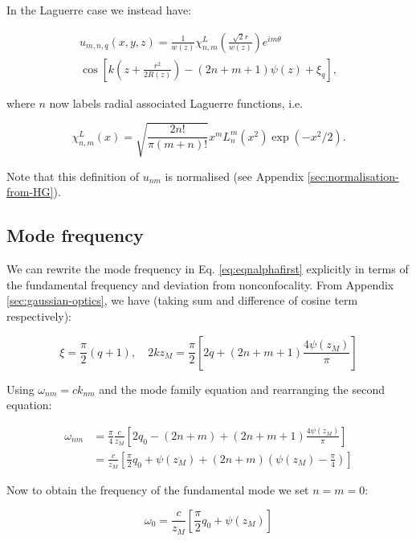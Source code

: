 \documentclass[a4paper,twocolumn,nobalancelastpage]{revtex4-1}
\begin{document}
In the Laguerre case we instead have:

\begin{multline}
  u_{m,n,q}(x,y,z) = 
  \frac{1}{w(z)}
  \chi^L_{n,m}\left( \frac{\sqrt{2}r}{w(z)} \right)
  e^{i m \theta}
  \\
  \cos \left[
    k \left( z + \frac{r^2}{2R(z)} \right) - (2n+m+1) \psi(z) + \xi_{q} \right],
\end{multline}

where $n$ now labels radial associated Laguerre functions, i.e.

\begin{displaymath}
  \chi^L_{n,m}(x) = 
  \sqrt{ \frac{2 n!}{\pi (m+n)!}}
  x^m L_n^m(x^2) \exp(-x^2/2).
\end{displaymath}

Note that this definition of $u_{nm}$ is normalised (see Appendix \ref{sec:normalisation-from-HG}).

\subsection{Mode frequency}
\label{sec:modefrequency}

We can rewrite the mode frequency in Eq. \ref{eq:eqnalphafirst} explicitly in terms of the fundamental frequency and deviation from nonconfocality.
From Appendix \ref{sec:gaussian-optics}, we have (taking sum and difference of cosine term respectively):

\begin{displaymath}
\xi=\frac{\pi}{2}(q+1), \quad 2kz_M=\frac{\pi}{2} \left[ 2q+(2n+m+1)\frac{4\psi(z_M)}{\pi}\right]
\end{displaymath}

Using $\omega_{nm}=c k_{nm}$ and the mode family equation and rearranging the second equation:

\begin{align}
\omega_{nm} & =\frac{\pi}{4} \frac{c}{z_M}
\left[ 2q_0-(2n+m)+(2n+m+1)\frac{4\psi(z_M)}{\pi}\right] \nonumber \\
 & = \frac{c}{z_M}
\left[  \frac{\pi}{2}q_0+\psi(z_M)+(2n+m)(\psi(z_M)-\frac{\pi}{4})\right] \nonumber
\end{align}

Now to obtain the frequency of the fundamental mode we set $n=m=0$:

\begin{equation}
\omega_0=\frac{c}{z_M} \left[ \frac{\pi}{2}q_0+\psi(z_M)\right]
\end{equation}
\end{document}
